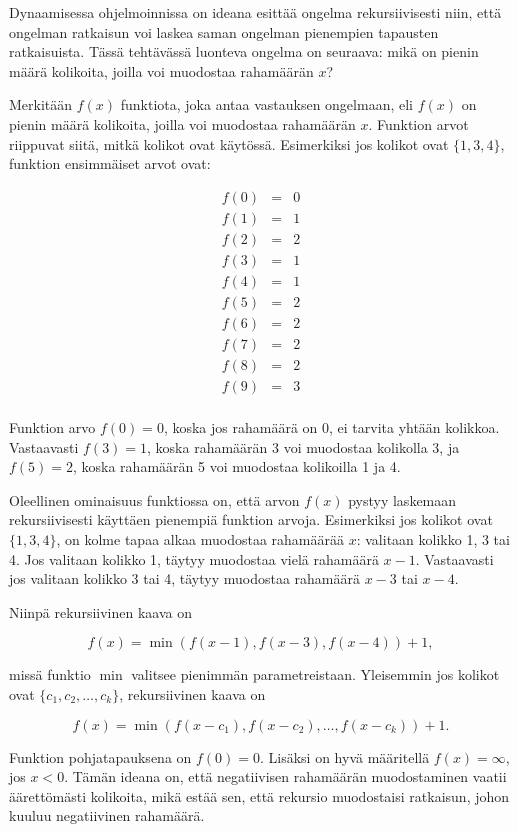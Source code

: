 Dynaamisessa ohjelmoinnissa on ideana esittää
ongelma rekursiivisesti niin,
että ongelman ratkaisun voi laskea
saman ongelman pienempien tapausten ratkaisuista.
Tässä tehtävässä luonteva ongelma on seuraava:
mikä on pienin määrä kolikoita,
joilla voi muodostaa rahamäärän $x$?

Merkitään $f(x)$ funktiota,
joka antaa vastauksen ongelmaan,
eli $f(x)$ on pienin määrä kolikoita,
joilla voi muodostaa rahamäärän $x$.
Funktion arvot riippuvat siitä,
mitkä kolikot ovat käytössä.
Esimerkiksi jos kolikot ovat $\{1,3,4\}$,
funktion ensimmäiset arvot ovat:

\[
\begin{array}{lcl}
f(0) & = & 0 \\
f(1) & = & 1 \\
f(2) & = & 2 \\
f(3) & = & 1 \\
f(4) & = & 1 \\
f(5) & = & 2 \\
f(6) & = & 2 \\
f(7) & = & 2 \\
f(8) & = & 2 \\
f(9) & = & 3 \\
\end{array}
\]

Funktion arvo $f(0)=0$, koska jos rahamäärä on 0,
ei tarvita yhtään kolikkoa.
Vastaavasti $f(3)=1$, koska rahamäärän 3
voi muodostaa kolikolla 3,
ja $f(5)=2$, koska rahamäärän 5
voi muodostaa kolikoilla 1 ja 4.

Oleellinen ominaisuus funktiossa on,
että arvon $f(x)$ pystyy laskemaan
rekursiivisesti käyttäen pienempiä
funktion arvoja.
Esimerkiksi jos kolikot ovat $\{1,3,4\}$,
on kolme tapaa alkaa muodostaa rahamäärää $x$:
valitaan kolikko 1, 3 tai 4.
Jos valitaan kolikko 1, täytyy
muodostaa vielä rahamäärä $x-1$.
Vastaavasti jos valitaan kolikko 3 tai 4,
täytyy muodostaa rahamäärä $x-3$ tai $x-4$.

Niinpä rekursiivinen kaava on

\[f(x) = \min(f(x-1),f(x-3),f(x-4))+1,\]

missä funktio $\min$ valitsee pienimmän parametreistaan.
Yleisemmin jos kolikot ovat $\{c_1,c_2,\ldots,c_k\}$,
rekursiivinen kaava on

\[f(x) = \min(f(x-c_1),f(x-c_2),\ldots,f(x-c_k))+1.\]

Funktion pohjatapauksena on $f(0)=0$.
Lisäksi on hyvä määritellä $f(x)=\infty$, jos $x<0$.
Tämän ideana on, että negatiivisen rahamäärän
muodostaminen vaatii äärettömästi kolikoita,
mikä estää sen, että rekursio muodostaisi
ratkaisun, johon kuuluu negatiivinen rahamäärä.

